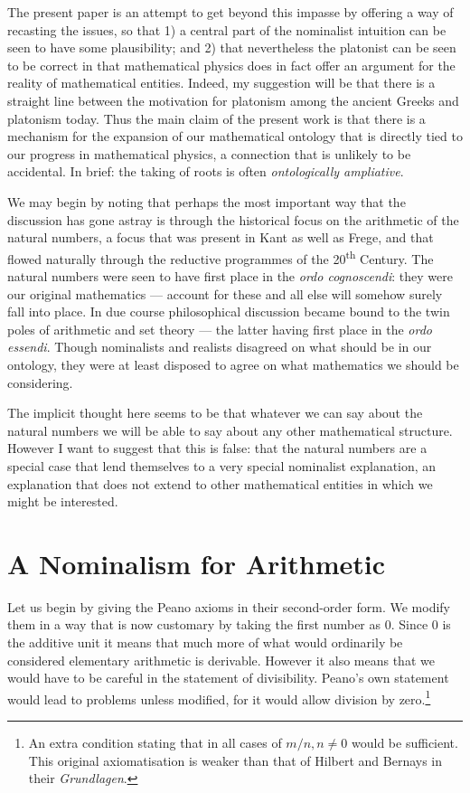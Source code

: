 \documentclass[11pt,oneside,a4paper]{article}
\begin{document}
The present paper is an attempt to get beyond this impasse by offering a way of recasting the issues, so that 1) a central part of the nominalist intuition can be seen to have some plausibility; and 2) that nevertheless the platonist can be seen to be correct in that mathematical physics does in fact offer an argument for the reality of mathematical entities. Indeed, my suggestion will be that there is a straight line between the motivation for platonism among the ancient Greeks and platonism today. Thus the main claim of the present work is that there is a mechanism for the expansion of our mathematical ontology that is directly tied to our progress in mathematical physics, a connection that is unlikely to be accidental. In brief: the taking of roots is often \textit{ontologically ampliative}. 

We may begin by noting that perhaps the most important way that the discussion has gone astray is through the historical focus on the arithmetic of the natural numbers, a focus that was present in Kant as well as Frege, and that flowed naturally through the reductive programmes of the 20\textsuperscript{th} Century. The natural numbers were seen to have first place in the \textit{ordo cognoscendi}: they were our original mathematics --- account for these and all else will somehow surely fall into place. In due course philosophical discussion became bound to the twin poles of arithmetic and set theory --- the latter having first place in the \textit{ordo essendi}. Though nominalists and realists disagreed on what should be in our ontology, they were at least disposed to agree on what mathematics we should be considering. 

The implicit thought here seems to be that whatever we can say about the natural numbers we will be able to say about any other mathematical structure. However I want to suggest that this is false: that the natural numbers are a special case that lend themselves to a very special nominalist explanation, an explanation that does not extend to other mathematical entities in which we might be interested.



\section{A Nominalism for Arithmetic}

Let us begin by giving the Peano axioms in their second-order form. We modify them in a way that is now customary by taking the first number as 0. Since 0 is the additive unit it means that much more of what would ordinarily be considered elementary arithmetic is derivable. However it also means that we would have to be careful in the statement of divisibility. Peano's own statement would lead to problems unless modified, for it would allow division by zero.\footnote{An extra condition stating that in all cases of $m/n, n \neq 0$ would be sufficient. This original axiomatisation is weaker than that of Hilbert and Bernays in their \textit{Grundlagen}.}
\end{document}
